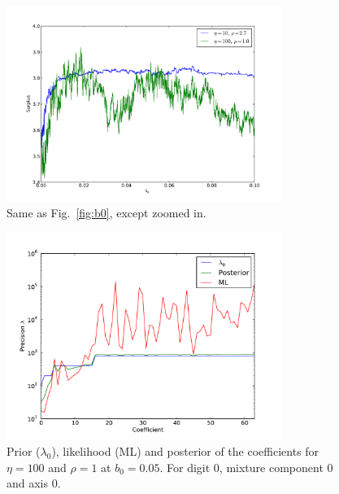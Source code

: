 \documentclass{report}
\begin{document}
\begin{figure}
    \centering
    \includegraphics[width=0.8\textwidth]{figs/surplus45.pdf}
    \caption{Same as Fig.~\ref{fig:b0}, except zoomed in.} \label{fig:b0zoom}
\end{figure}


\begin{figure}
    \centering
    \includegraphics[width=0.8\textwidth]{figs/plotb000-eta100-rho1.pdf}
    \caption{Prior ($\lambda_0$), likelihood (ML) and posterior of the coefficients for $\eta=100$ and $\rho=1$ at $b_0 = 0.05$. For digit 0, mixture component 0 and axis 0.} \label{fig:rho1}
\end{figure}
\end{document}
